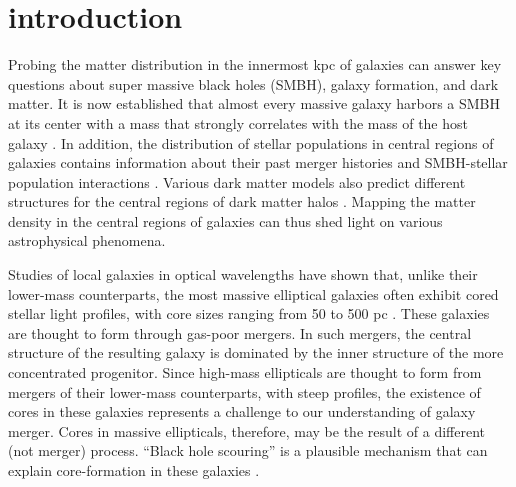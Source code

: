 \documentclass[chicago]{emulateapj}
\begin{document}
\section{introduction}
Probing the matter distribution in the innermost kpc of galaxies can answer key questions about super massive black holes (SMBH), galaxy formation, and dark matter. It is now established that almost every massive galaxy harbors a SMBH at its center with a mass that strongly correlates with the mass of the host galaxy \citep{Kormendy:95,Ferrarese:00,Gebhardt:00,Tremaine:02}.
In addition, the distribution of stellar populations in central regions of galaxies contains information about their past merger histories and SMBH-stellar population interactions \citep[e.g.,][]{Barnes:92,Ebisuzaki:91}.  Various dark matter models also predict different structures for the central regions of dark matter halos \citep[e.g.,][]{Rocha:13}.  Mapping the matter density in the central regions of galaxies can thus shed light on various astrophysical phenomena.

Studies of local galaxies in optical wavelengths have shown that, unlike their lower-mass counterparts, the most massive elliptical galaxies often exhibit cored stellar light profiles, with core sizes ranging from 50 to 500 pc \citep[e.g.,][]{Ferrarese:06}. 
These galaxies are thought to form through gas-poor mergers. In such mergers, the central structure of the resulting galaxy is dominated by the inner structure of the more concentrated progenitor.  Since high-mass ellipticals are thought to form from mergers of their lower-mass counterparts, with steep profiles, the existence of cores in these galaxies represents a challenge to our understanding of galaxy merger. Cores in massive ellipticals, therefore, may be the result of a different (not merger) process.  
``Black hole scouring'' is a plausible mechanism that can explain core-formation in these galaxies \citep{Thomas:14}.
\end{document}
